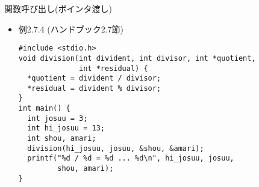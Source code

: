 \begin{frame}[t,fragile]{関数呼び出し(ポインタ渡し)}
  \begin{itemize}
  \item 例2.7.4 (ハンドブック2.7節)
\begin{lstlisting}
#include <stdio.h>
void division(int divident, int divisor, int *quotient,
              int *residual) {
  *quotient = divident / divisor;
  *residual = divident % divisor;
}
int main() {
  int josuu = 3;
  int hi_josuu = 13;
  int shou, amari;
  division(hi_josuu, josuu, &shou, &amari);
  printf("%d / %d = %d ... %d\n", hi_josuu, josuu,
         shou, amari);
}
\end{lstlisting}
  \end{itemize}
\end{frame}
